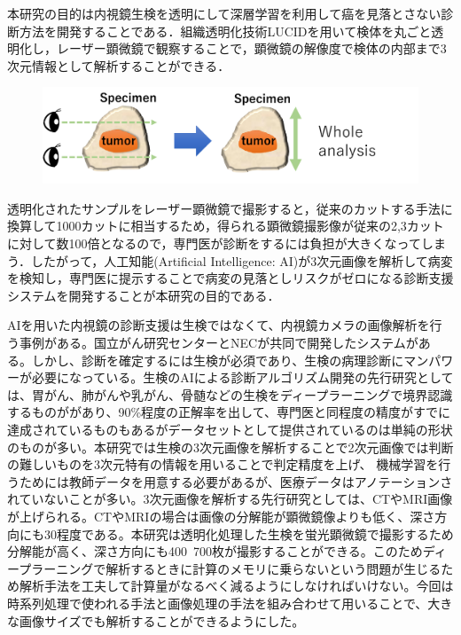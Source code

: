 本研究の目的は内視鏡生検を透明にして深層学習を利用して癌を見落とさない診断方法を開発することである．組織透明化技術LUCIDを用いて検体を丸ごと透明化し，レーザー顕微鏡で観察することで，顕微鏡の解像度で検体の内部まで3次元情報として解析することができる．

\begin{figure}
	\centering
	\includegraphics[width=0.7\linewidth]{fig/chapter1/whole_image_analysis}
	\caption[whole image analysis]{}
	\label{fig:wholeimageanalysis}
\end{figure}


透明化されたサンプルをレーザー顕微鏡で撮影すると，従来のカットする手法に換算して1000カットに相当するため，得られる顕微鏡撮影像が従来の2,3カットに対して数100倍となるので，専門医が診断をするには負担が大きくなってしまう．したがって，人工知能(Artificial Intelligence: AI)が3次元画像を解析して病変を検知し，専門医に提示することで病変の見落としリスクがゼロになる診断支援システムを開発することが本研究の目的である．

AIを用いた内視鏡の診断支援は生検ではなくて、内視鏡カメラの画像解析を行う事例がある。国立がん研究センターとNECが共同で開発したシステムがある。しかし、診断を確定するには生検が必須であり、生検の病理診断にマンパワーが必要になっている。生検のAIによる診断アルゴリズム開発の先行研究としては、胃がん、肺がんや乳がん、骨髄などの生検をディープラーニングで境界認識するものががあり、90\%程度の正解率を出して、専門医と同程度の精度がすでに達成されているものもあるがデータセットとして提供されているのは単純の形状のものが多い。本研究では生検の3次元画像を解析することで2次元画像では判断の難しいものを3次元特有の情報を用いることで判定精度を上げ、
機械学習を行うためには教師データを用意する必要があるが、医療データはアノテーションされていないことが多い。3次元画像を解析する先行研究としては、CTやMRI画像が上げられる。CTやMRIの場合は画像の分解能が顕微鏡像よりも低く、深さ方向にも30程度である。本研究は透明化処理した生検を蛍光顕微鏡で撮影するため分解能が高く、深さ方向にも400~700枚が撮影することができる。このためディープラーニングで解析するときに計算のメモリに乗らないという問題が生じるため解析手法を工夫して計算量がなるべく減るようにしなければいけない。今回は時系列処理で使われる手法と画像処理の手法を組み合わせて用いることで、大きな画像サイズでも解析することができるようにした。


